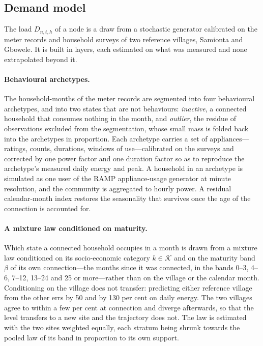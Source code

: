 \documentclass[11pt,a4paper]{article}
\theoremstyle{plain}
\theoremstyle{definition}
\begin{document}
\subsection{Demand model}
\label{sec:demand}

The load $D_{n,t,h}$ of a node is a draw from a stochastic generator calibrated on the meter
records and household surveys of two reference villages, Samionta and Gbowele. It is built
in layers, each estimated on what was measured and none extrapolated beyond it.

\paragraph{Behavioural archetypes.} The household-months of the meter records are segmented
into four behavioural archetypes, and into two states that are not behaviours:
\emph{inactive}, a connected household that consumes nothing in the month, and
\emph{outlier}, the residue of observations excluded from the segmentation, whose small
mass is folded back into the archetypes in proportion. Each archetype carries a set of
appliances---ratings, counts, durations, windows of use---calibrated on the surveys and
corrected by one power factor and one duration factor so as to reproduce the archetype's
measured daily energy and peak. A household in an archetype is simulated as one user of
the RAMP appliance-usage generator at minute resolution, and the community is aggregated to
hourly power. A residual calendar-month index restores the seasonality that survives once
the age of the connection is accounted for.

\paragraph{A mixture law conditioned on maturity.} Which state a connected household
occupies in a month is drawn from a mixture law conditioned on its socio-economic category
$k\in\mathcal{K}$ and on the maturity band $\beta$ of its own connection---the months since
it was connected, in the bands 0--3, 4--6, 7--12, 13--24 and 25 or more---rather than on the
village or the calendar month. Conditioning on the village does not transfer: predicting
either reference village from the other errs by 50 and by 130 per cent on daily energy. The
two villages agree to within a few per cent at connection and diverge afterwards, so that
the level transfers to a new site and the trajectory does not. The law is estimated with
the two sites weighted equally, each stratum being shrunk towards the pooled law of its band
in proportion to its own support.
\end{document}
